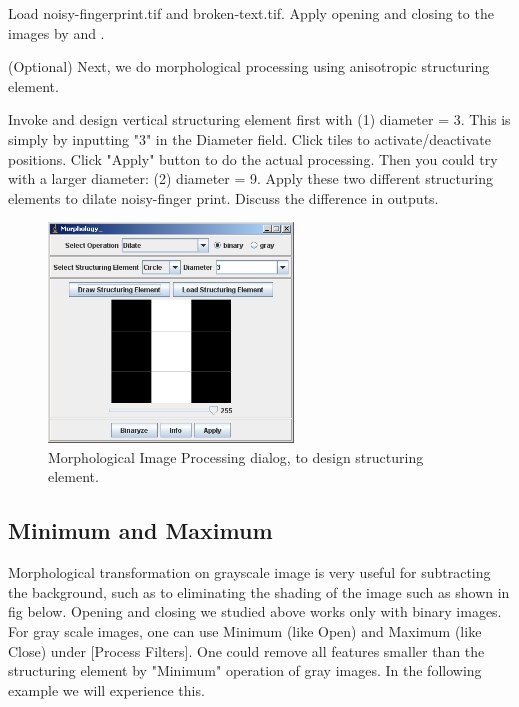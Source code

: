 \begin{indentexercise}{1}
Load noisy-fingerprint.tif and broken-text.tif. Apply
opening and closing to the images by  and . 
\end{indentexercise}


\begin{indentexercise}{2}
(Optional) Next, we do morphological processing using anisotropic structuring
element. 

Invoke  and design vertical structuring element first with (1)
diameter = 3. This is simply by inputting
"3" in the Diameter field. Click tiles
to activate/deactivate positions. Click
"Apply" button to do the actual
processing. Then you could try with a larger diameter: (2) diameter =
9. Apply these two different structuring elements to dilate
noisy-finger print. Discuss the difference in outputs. 


\begin{figure}[htbp]
\begin{center}
\includegraphics[width=6.5cm]{img/CMCIBasicCourse201102-img68.png}
\caption{ Morphological Image Processing dialog, to design structuring element.}
\label{fig:img68}
\end{center}
\end{figure}
\end{indentexercise}

\subsection{Minimum and Maximum}

Morphological transformation on grayscale image is very useful for
subtracting the background, such as to eliminating the shading of the
image such as shown in fig below. Opening and closing we studied above
works only with binary images. For gray scale images, one can use
Minimum (like Open) and Maximum (like Close) under [Process
Filters]. One could remove all features smaller than
the structuring element by "Minimum"
operation of gray images. In the following example we will experience
this.

